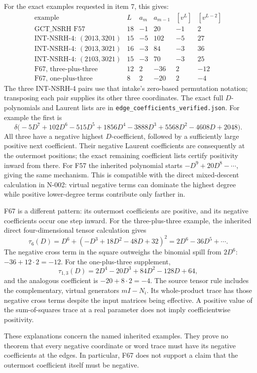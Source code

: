 For the exact examples requested in item 7, this gives:
\[
\begin{array}{l|r|r|r|r|r}
\text{example}&L&a_m&a_{m-1}&[v^L]&[v^{L-2}]\\\hline
\text{GCT\_NSRH F57}&18&-1&20&-1&2\\
\text{INT-NSRH-4: }(2013,3201)&15&-5&102&-5&27\\
\text{INT-NSRH-4: }(2013,3021)&16&-3&84&-3&36\\
\text{INT-NSRH-4: }(2103,3021)&15&-3&70&-3&25\\
\text{F67, three-plus-three}&12&2&-36&2&-12\\
\text{F67, one-plus-three}&8&2&-20&2&-4
\end{array}
 \tag{N-35}
\]
The three INT-NSRH-4 pairs use that intake's zero-based permutation
notation; transposing each pair supplies its other three coordinates.
The exact full $D$-polynomials and Laurent lists are in
\nolinkurl{edge_coefficients_verified.json}.  For example the first is
\[
\delta\bigl(-5D^7+102D^6-515D^5+1856D^4-3888D^3
                     +5568D^2-4608D+2048\bigr).
\]
All three have a negative highest $D$-coefficient, followed by a
sufficiently large positive next coefficient.  Their negative Laurent
coefficients are consequently at the outermost positions; the exact
remaining coefficient lists certify positivity inward from there.
For F57 the inherited polynomial starts $-D^9+20D^8-\cdots$, giving
the same mechanism.  This is compatible with the direct mixed-descent
calculation in N-002: virtual negative terms can dominate the highest
degree while positive lower-degree terms contribute only farther in.

F67 is a different pattern: its outermost coefficients are positive,
and its negative coefficients occur one step inward.  For the
three-plus-three example, the inherited direct four-dimensional
tensor calculation gives
\[
 \tau_6(D)=D^6+(-D^3+18D^2-48D+32)^2
          =2D^6-36D^5+\cdots.
\]
The negative cross term in the square outweighs the binomial spill
from $2D^6$: $-36+12\cdot2=-12$.  For the one-plus-three supplement,
\[
 \tau_{1,3}(D)=2D^4-20D^3+84D^2-128D+64,
\]
and the analogous coefficient is $-20+8\cdot2=-4$.
The source tensor rule includes the complementary, virtual generators
$mI-N_i$.  Its whole-product trace has those negative cross terms
despite the input matrices being effective.  A positive value of the
sum-of-squares trace at a real parameter does not imply coefficientwise
positivity.

These explanations concern the named inherited examples.  They prove
no theorem that every negative coordinate or word trace must have its
negative coefficients at the edges.  In particular, F67 does not
support a claim that the outermost coefficient itself must be negative.

